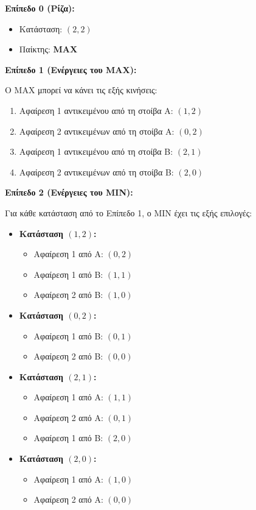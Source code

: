 \documentclass{article}
\begin{document}
\textbf{Επίπεδο 0 (Ρίζα):}
\begin{itemize}
    \item Κατάσταση: $(2, 2)$
    \item Παίκτης: \textbf{MAX}
\end{itemize}

\textbf{Επίπεδο 1 (Ενέργειες του MAX):}

Ο MAX μπορεί να κάνει τις εξής κινήσεις:
\begin{enumerate}
    \item Αφαίρεση 1 αντικειμένου από τη στοίβα A: $(1, 2)$
    \item Αφαίρεση 2 αντικειμένων από τη στοίβα A: $(0, 2)$
    \item Αφαίρεση 1 αντικειμένου από τη στοίβα B: $(2, 1)$
    \item Αφαίρεση 2 αντικειμένων από τη στοίβα B: $(2, 0)$
\end{enumerate}

\textbf{Επίπεδο 2 (Ενέργειες του MIN):}

Για κάθε κατάσταση από το Επίπεδο 1, ο MIN έχει τις εξής επιλογές:

\begin{itemize}
    \item \textbf{Κατάσταση $(1, 2)$:}
    \begin{itemize}
        \item Αφαίρεση 1 από A: $(0, 2)$
        \item Αφαίρεση 1 από B: $(1, 1)$
        \item Αφαίρεση 2 από B: $(1, 0)$
    \end{itemize}
    \item \textbf{Κατάσταση $(0, 2)$:}
    \begin{itemize}
        \item Αφαίρεση 1 από B: $(0, 1)$
        \item Αφαίρεση 2 από B: $(0, 0)$
    \end{itemize}
    \item \textbf{Κατάσταση $(2, 1)$:}
    \begin{itemize}
        \item Αφαίρεση 1 από A: $(1, 1)$
        \item Αφαίρεση 2 από A: $(0, 1)$
        \item Αφαίρεση 1 από B: $(2, 0)$
    \end{itemize}
    \item \textbf{Κατάσταση $(2, 0)$:}
    \begin{itemize}
        \item Αφαίρεση 1 από A: $(1, 0)$
        \item Αφαίρεση 2 από A: $(0, 0)$
    \end{itemize}
\end{itemize}
\end{document}
